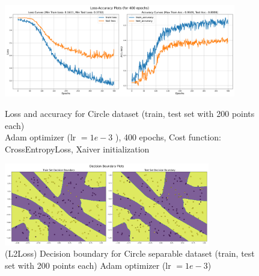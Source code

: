 \begin{solve}
\begin{figure}[H]
    \centering
    \includegraphics[width=0.9\textwidth]{plots/sinusoid_adam-lr-1e-3_more_layersloss_acc.png}
    \caption{Loss and accuracy for Circle dataset (train, test set with 200 points each)\\ Adam optimizer (lr $=1e-3$ ), 400 epochs, Cost function: CrossEntropyLoss, Xaiver initialization}
    \includegraphics[width=0.8\textwidth]{plots/sinusoid_adam-lr-1e-3_more_layersboundary.png}
    \caption{(L2Loss) Decision boundary for Circle separable dataset (train, test set with 200 points each) 
    Adam optimizer (lr $=1e-3$)}
\end{figure}




\end{solve}
